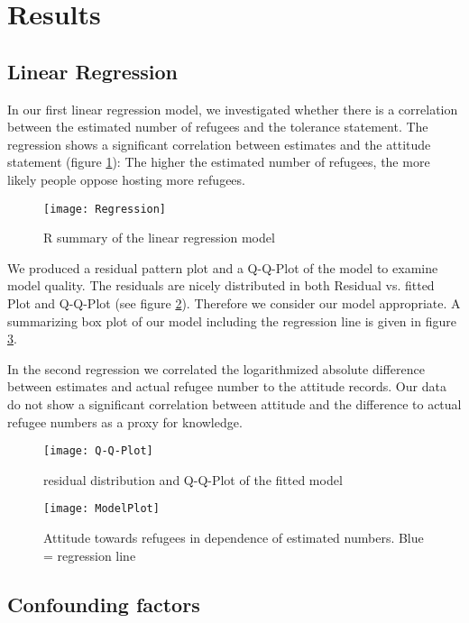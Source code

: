 \section{Results}


\subsection{Linear Regression}
In our first linear regression model, we investigated whether there is a correlation between the estimated number of refugees and the tolerance statement. 
The regression shows a significant correlation between estimates and the attitude statement (figure \ref{fig: Regression}): The higher the estimated number of refugees, the more likely people oppose hosting more refugees.

\begin{figure}[H]
	\centering 
	\texttt{[image: Regression]}
	\caption{R summary of the linear regression model}\label{fig: Regression}
\end{figure}

We produced a residual pattern plot and a Q-Q-Plot of the model to examine model quality. The residuals are nicely distributed in both Residual vs. fitted Plot and Q-Q-Plot (see figure \ref{fig: Q-Q-Plot}). Therefore we consider our model appropriate.
A summarizing box plot of our model including the regression line is given in figure \ref{fig: ModelPlot}.

In the second regression we correlated the logarithmized absolute difference between estimates and actual refugee number to the attitude records. Our data do not show a significant correlation between attitude and the difference to actual refugee numbers as a proxy for knowledge.



\begin{figure}[H]
	\centering 
	\texttt{[image: Q-Q-Plot]}
	\caption{residual distribution and Q-Q-Plot of the fitted model}\label{fig: Q-Q-Plot}
\end{figure}


\begin{figure}[H]
	\centering 
	\texttt{[image: ModelPlot]}
	\caption{Attitude towards refugees in dependence of estimated numbers. Blue = regression line}\label{fig: ModelPlot}
\end{figure}


\subsection{Confounding factors}

